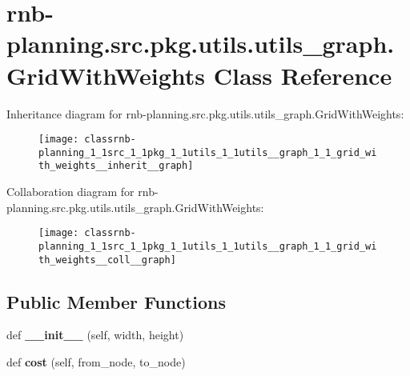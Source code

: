 \hypertarget{classrnb-planning_1_1src_1_1pkg_1_1utils_1_1utils__graph_1_1_grid_with_weights}{}\section{rnb-\/planning.src.\+pkg.\+utils.\+utils\+\_\+graph.\+Grid\+With\+Weights Class Reference}
\label{classrnb-planning_1_1src_1_1pkg_1_1utils_1_1utils__graph_1_1_grid_with_weights}


Inheritance diagram for rnb-\/planning.src.\+pkg.\+utils.\+utils\+\_\+graph.\+Grid\+With\+Weights\+:
\nopagebreak
\begin{figure}[H]
\begin{center}
\leavevmode
\texttt{[image: classrnb-planning\_1\_1src\_1\_1pkg\_1\_1utils\_1\_1utils\_\_graph\_1\_1\_grid\_with\_weights\_\_inherit\_\_graph]}
\end{center}
\end{figure}


Collaboration diagram for rnb-\/planning.src.\+pkg.\+utils.\+utils\+\_\+graph.\+Grid\+With\+Weights\+:
\nopagebreak
\begin{figure}[H]
\begin{center}
\leavevmode
\texttt{[image: classrnb-planning\_1\_1src\_1\_1pkg\_1\_1utils\_1\_1utils\_\_graph\_1\_1\_grid\_with\_weights\_\_coll\_\_graph]}
\end{center}
\end{figure}
\subsection*{Public Member Functions}
\begin{DoxyCompactItemize}
\item 
\mbox{\label{classrnb-planning_1_1src_1_1pkg_1_1utils_1_1utils__graph_1_1_grid_with_weights_aa4c2ec9dfefa07f36a3496ce63bda03f}} 
def {\bfseries \+\_\+\+\_\+init\+\_\+\+\_\+} (self, width, height)
\item 
\mbox{\label{classrnb-planning_1_1src_1_1pkg_1_1utils_1_1utils__graph_1_1_grid_with_weights_aa6e027c6cce7db8204158e489770b1e9}} 
def {\bfseries cost} (self, from\+\_\+node, to\+\_\+node)
\end{DoxyCompactItemize}
